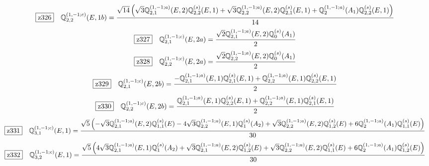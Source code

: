 \documentclass[fleqn,10pt,landscape]{jsarticle}
\begin{document}
\begin{dmath*}
\hspace*{3mm}\fbox{z326}\quad \mathbb{Q}_{2,2}^{(1,-1;c)}(E,1b)=\frac{\sqrt{14} \left(\sqrt{3} \mathbb{Q}_{2,1}^{(1,-1;a)}(E,2) \mathbb{Q}_{2,2}^{(s)}(E,1) + \sqrt{3} \mathbb{Q}_{2,2}^{(1,-1;a)}(E,2) \mathbb{Q}_{2,1}^{(s)}(E,1) + \mathbb{Q}_{2}^{(1,-1;a)}(A_{1}) \mathbb{Q}_{2,2}^{(s)}(E,1)\right)}{14}
\end{dmath*}
\begin{dmath*}
\hspace*{3mm}\fbox{z327}\quad \mathbb{Q}_{2,1}^{(1,-1;c)}(E,2a)=\frac{\sqrt{2} \mathbb{Q}_{2,1}^{(1,-1;a)}(E,2) \mathbb{Q}_{0}^{(s)}(A_{1})}{2}
\end{dmath*}
\begin{dmath*}
\hspace*{3mm}\fbox{z328}\quad \mathbb{Q}_{2,2}^{(1,-1;c)}(E,2a)=\frac{\sqrt{2} \mathbb{Q}_{2,2}^{(1,-1;a)}(E,2) \mathbb{Q}_{0}^{(s)}(A_{1})}{2}
\end{dmath*}
\begin{dmath*}
\hspace*{3mm}\fbox{z329}\quad \mathbb{Q}_{2,1}^{(1,-1;c)}(E,2b)=\frac{- \mathbb{Q}_{2,1}^{(1,-1;a)}(E,1) \mathbb{Q}_{2,1}^{(s)}(E,1) + \mathbb{Q}_{2,2}^{(1,-1;a)}(E,1) \mathbb{Q}_{2,2}^{(s)}(E,1)}{2}
\end{dmath*}
\begin{dmath*}
\hspace*{3mm}\fbox{z330}\quad \mathbb{Q}_{2,2}^{(1,-1;c)}(E,2b)=\frac{\mathbb{Q}_{2,1}^{(1,-1;a)}(E,1) \mathbb{Q}_{2,2}^{(s)}(E,1) + \mathbb{Q}_{2,2}^{(1,-1;a)}(E,1) \mathbb{Q}_{2,1}^{(s)}(E,1)}{2}
\end{dmath*}
\begin{dmath*}
\hspace*{3mm}\fbox{z331}\quad \mathbb{Q}_{3,1}^{(1,-1;c)}(E,1)=\frac{\sqrt{5} \left(- \sqrt{3} \mathbb{Q}_{2,1}^{(1,-1;a)}(E,2) \mathbb{Q}_{1,1}^{(s)}(E) - 4 \sqrt{3} \mathbb{Q}_{2,2}^{(1,-1;a)}(E,1) \mathbb{Q}_{1}^{(s)}(A_{2}) + \sqrt{3} \mathbb{Q}_{2,2}^{(1,-1;a)}(E,2) \mathbb{Q}_{1,2}^{(s)}(E) + 6 \mathbb{Q}_{2}^{(1,-1;a)}(A_{1}) \mathbb{Q}_{1,1}^{(s)}(E)\right)}{30}
\end{dmath*}
\begin{dmath*}
\hspace*{3mm}\fbox{z332}\quad \mathbb{Q}_{3,2}^{(1,-1;c)}(E,1)=\frac{\sqrt{5} \left(4 \sqrt{3} \mathbb{Q}_{2,1}^{(1,-1;a)}(E,1) \mathbb{Q}_{1}^{(s)}(A_{2}) + \sqrt{3} \mathbb{Q}_{2,1}^{(1,-1;a)}(E,2) \mathbb{Q}_{1,2}^{(s)}(E) + \sqrt{3} \mathbb{Q}_{2,2}^{(1,-1;a)}(E,2) \mathbb{Q}_{1,1}^{(s)}(E) + 6 \mathbb{Q}_{2}^{(1,-1;a)}(A_{1}) \mathbb{Q}_{1,2}^{(s)}(E)\right)}{30}
\end{dmath*}
\end{document}
